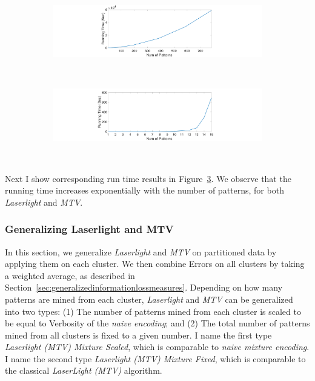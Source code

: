 \begin{figure}[h!]
	\captionsetup[subfigure]{justification=centering}
    \centering

    \begin{subfigure}[b]{0.48\textwidth}
        \centering       
        \includegraphics[width=\textwidth]{QueryLogSummarization/graphics/Laserlight_runningTimes_vs_NumOfPatterns.pdf}
       \label{fig:laserlight_runningTimes_vs_NumOfPatterns}
\end{subfigure}
    ~
     \begin{subfigure}[b]{0.48\textwidth}
        \centering       
        \includegraphics[width=\textwidth]{QueryLogSummarization/graphics/MTV_runningTimes_vs_NumOfPatterns.pdf}
       \label{fig:mtv_runningTimes_vs_NumOfPatterns}
\end{subfigure}
    ~   
   \label{fig:runningTime_analysis}
\trimfigurewhitespace
\end{figure}

Next I show corresponding run time results in Figure~\ref{fig:runningTime_analysis}.
We observe that the running time increases exponentially with the number of patterns, for both \textit{Laserlight} and \textit{MTV}.

\subsubsection{Generalizing Laserlight and MTV}
\label{sec:generalizinglaserlightandmtv}
In this section, we generalize \textit{Laserlight} and \textit{MTV} on partitioned data by applying them on each cluster.
We then combine Errors on all clusters by taking a weighted average, as described in Section~\ref{sec:generalizedinformationlossmeasures}.
Depending on how many patterns are mined from each cluster, \textit{Laserlight} and \textit{MTV} can be generalized into two types: (1) The number of patterns mined from each cluster is scaled to be equal to Verbosity of the \emph{naive encoding}; and (2) The total number of patterns mined from all clusters is fixed to a given number.
I name the first type \emph{Laserlight (MTV) Mixture Scaled}, which is comparable to \emph{naive mixture encoding}.
I name the second type \emph{Laserlight (MTV) Mixture Fixed}, which is comparable to the classical \emph{LaserLight (MTV)} algorithm.

